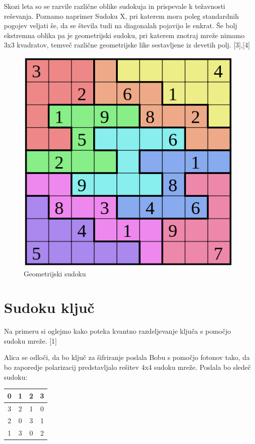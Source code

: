 \documentclass[A4paper, 11pt]{article}
\begin{document}
Skozi leta so se razvile različne oblike sudokuja in prispevale k težavnosti reševanja. Poznamo naprimer Sudoku X, pri katerem mora poleg standardnih pogojev veljati še, da se števila tudi na diagonalah pojavijo le enkrat. Še bolj ekstremna oblika pa je geometrijski sudoku, pri katerem znotraj mreže nimamo 3x3 kvadratov, temveč različne geometrijske like sestavljene iz devetih polj. [3],[4]

\begin{figure}[h]
\centering
\caption{Geometrijski sudoku}
\includegraphics[scale=0.4]{geo_sudoku}
\end{figure}


\section{Sudoku ključ}

Na primeru si oglejmo kako poteka kvantno razdeljevanje ključa s pomočjo sudoku mreže. [1]

Alica se odloči, da bo ključ za šifriranje poslala Bobu s pomočjo fotonov tako, da bo zaporedje polarizacij predstavljalo rešitev 4x4 sudoku mreže. Poslala bo sledeč sudoku:

\begin{center}
\begin{tabular}{| c | c || c | c |}
\hline
0 & 1 & 2 & 3\\
\hline
3 & 2 & 1 & 0\\
\hline
\hline
2 & 0 & 3 & 1\\
\hline
1 & 3 & 0 & 2\\
\hline
\end{tabular}
\end{center}
\end{document}
